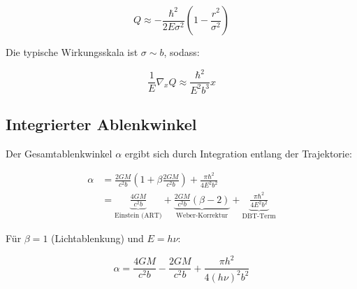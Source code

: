 \begin{equation}
Q \approx -\frac{\hbar^2}{2E\sigma^2}\left(1 - \frac{r^2}{\sigma^2}\right)
\end{equation}

Die typische Wirkungsskala ist $\sigma \sim b$, sodass:

\begin{equation}
\frac{1}{E}\nabla_x Q \approx \frac{\hbar^2}{E^2b^3}x
\end{equation}

\subsection{Integrierter Ablenkwinkel}
Der Gesamtablenkwinkel $\alpha$ ergibt sich durch Integration entlang der Trajektorie:

\begin{align}
\alpha &= \frac{2GM}{c^2b}\left(1 + \beta\frac{2GM}{c^2b}\right) + \frac{\pi\hbar^2}{4E^2b^2} \\
&= \underbrace{\frac{4GM}{c^2b}}_{\text{Einstein (ART)}} + \underbrace{\frac{2GM}{c^2b}\left(\beta - 2\right)}_{\text{Weber-Korrektur}} + \underbrace{\frac{\pi\hbar^2}{4E^2b^2}}_{\text{DBT-Term}}
\end{align}

Für $\beta = 1$ (Lichtablenkung) und $E = h\nu$:

\begin{equation}
\boxed{
\alpha = \frac{4GM}{c^2b} - \frac{2GM}{c^2b} + \frac{\pi h^2}{4(h\nu)^2b^2}
}
\end{equation}
